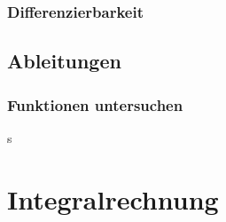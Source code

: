 \documentclass[a4paper, fontsize = 7pt, landscape]{scrartcl}
\begin{document}
\begin{multicols*}{3}
                        \subsubsection{Differenzierbarkeit}
                        
                    
                                 

                            \raggedcolumns
                            \columnbreak
                        
                        
        
                        \subsection{Ableitungen}
                              
                            \raggedcolumns
                            \columnbreak
                            
                            \raggedcolumns
                            \columnbreak

                            
                            \subsubsection{Funktionen untersuchen}
                            
                            
                            
                            
                           
                            
                            \raggedcolumns
                            \columnbreak
                            s\\
                            \raggedcolumns
                            \columnbreak
                            

                \section{Integralrechnung}
                            
                            

\end{multicols*}
\end{document}
